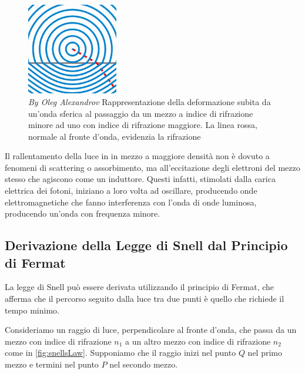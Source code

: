 \documentclass[12pt,a4paper]{report}
\begin{document}
\begin{figure}[!ht]
    \centering
    \includegraphics[width=150px]{Immagini/Snells_law_wavefronts.png}
    \captionsetup{width=.8\linewidth}
    \caption[\textit{By Oleg Alexandrov}]{\textit{By Oleg Alexandrov\footnotemark} Rappresentazione della deformazione subita da un'onda sferica al passaggio da un mezzo a indice di rifrazione minore ad uno con indice di rifrazione maggiore. La linea rossa, normale al fronte d'onda, evidenzia la rifrazione}
    \label{fig:wawefrontRefraction}
\end{figure}

Il rallentamento della luce in in mezzo a maggiore densità non è dovuto a fenomeni di scattering o assorbimento, ma all'eccitazione degli elettroni del mezzo stesso che agiscono come un induttore. Questi infatti, stimolati dalla carica elettrica dei fotoni, iniziano a loro volta ad oscillare, producendo onde elettromagnetiche che fanno interferenza con l'onda di onde luminosa, producendo un'onda con frequenza minore\cite{Fermilab2019}.

\subsection{Derivazione della Legge di Snell dal Principio di Fermat}

La legge di Snell può essere derivata utilizzando il principio di Fermat, che afferma che il percorso seguito dalla luce tra due punti è quello che richiede il tempo minimo.

Consideriamo un raggio di luce, perpendicolare al fronte d'onda, che passa da un mezzo con indice di rifrazione \( n_1 \) a un altro mezzo con indice di rifrazione \( n_2 \) come in \cref{fig:snellsLaw}. Supponiamo che il raggio inizi nel punto \( Q \) nel primo mezzo e termini nel punto \( P \) nel secondo mezzo.
\end{document}
